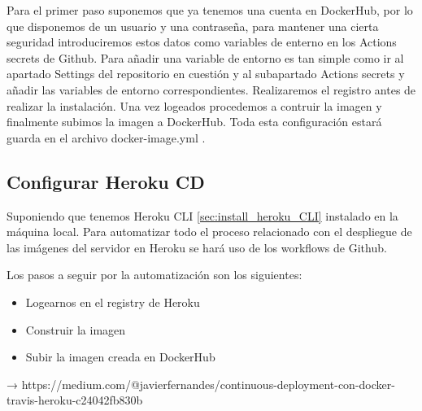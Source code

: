 Para el primer paso suponemos que ya tenemos una cuenta en DockerHub, por lo que disponemos de un usuario y una contraseña, para mantener una cierta seguridad introduciremos estos datos como variables de enterno en los Actions secrets de Github. Para añadir una variable de entorno es tan simple como ir al apartado Settings del repositorio en cuestión y al subapartado Actions secrets y añadir las variables de entorno correspondientes. Realizaremos el registro antes de realizar la instalación. Una vez logeados procedemos a contruir la imagen y finalmente subimos la imagen a DockerHub. Toda esta configuración estará guarda en el archivo docker-image.yml .


\subsection{Configurar Heroku CD}

Suponiendo que tenemos Heroku CLI \ref{sec:install_heroku_CLI} instalado en la máquina local. Para automatizar todo el proceso relacionado con el despliegue de las imágenes del servidor en Heroku se hará uso de los workflows de Github.

Los pasos a seguir por la automatización son los siguientes:

\begin{itemize}
    \item Logearnos en el registry de Heroku
    \item Construir la imagen
    \item Subir la imagen creada en DockerHub
\end{itemize}




































→ https://medium.com/@javierfernandes/continuous-deployment-con-docker-travis-heroku-c24042fb830b